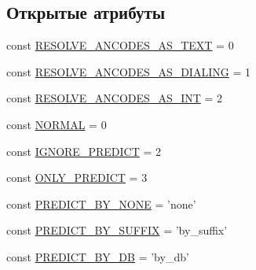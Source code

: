 \subsection*{Открытые атрибуты}
\begin{DoxyCompactItemize}
\item 
const \hyperlink{classphpMorphy_a919a599c76ec4bb2a5f284d9a1b0da2e}{RESOLVE\_\-ANCODES\_\-AS\_\-TEXT} = 0
\item 
const \hyperlink{classphpMorphy_a9cfb01a8a056c9322e3bb3680a8b921c}{RESOLVE\_\-ANCODES\_\-AS\_\-DIALING} = 1
\item 
const \hyperlink{classphpMorphy_a7619b0422b061a198516617ab96673f2}{RESOLVE\_\-ANCODES\_\-AS\_\-INT} = 2
\item 
const \hyperlink{classphpMorphy_a8cfde1e320c3114a46b5a250cfa2c368}{NORMAL} = 0
\item 
const \hyperlink{classphpMorphy_a96773a087cbcf69f52e1cddad0060c3d}{IGNORE\_\-PREDICT} = 2
\item 
const \hyperlink{classphpMorphy_a2ab6f41bcb2c2bb31dd1f7f92f1b38ee}{ONLY\_\-PREDICT} = 3
\item 
const \hyperlink{classphpMorphy_a9359de1c31adfc1c10894cbead48e2ba}{PREDICT\_\-BY\_\-NONE} = 'none'
\item 
const \hyperlink{classphpMorphy_a1c02f9420ccc29ac4e2f80bf3688994d}{PREDICT\_\-BY\_\-SUFFIX} = 'by\_\-suffix'
\item 
const \hyperlink{classphpMorphy_ada1e5f1e0eb2de867e273e23a4022955}{PREDICT\_\-BY\_\-DB} = 'by\_\-db'
\end{DoxyCompactItemize}
